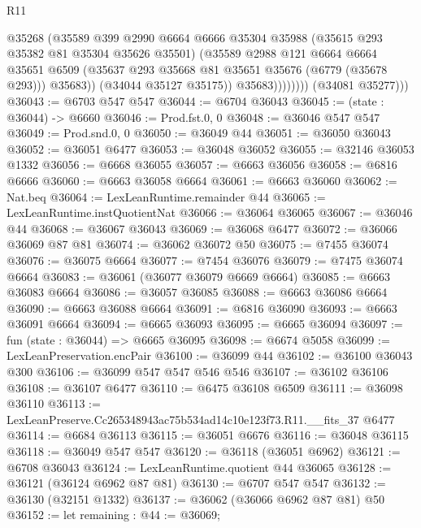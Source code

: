 \begin{lexlean}{R11}
\begin{coremodule}
                          @35268
                          (@35589
                            @399
                            @2990
                            @6664
                            @6666
                            @35304
                            @35988
                            (@35615 @293 @35382 @81 @35304 @35626 @35501)
                            (@35589
                              @2988
                              @121
                              @6664
                              @6664
                              @35651
                              @6509
                              (@35637 @293 @35668 @81 @35651 @35676 (@6779 (@35678 @293)))
                              @35683))
                          (@34044 @35127 @35175))
                        @35683))))))))
        (@34081 @35277)))
@36043 := @6703 @547 @547
@36044 := @6704 @36043
@36045 := (state : @36044) -> @6660
@36046 := Prod.fst.{0, 0}
@36048 := @36046 @547 @547
@36049 := Prod.snd.{0, 0}
@36050 := @36049 @44
@36051 := @36050 @36043
@36052 := @36051 @6477
@36053 := @36048 @36052
@36055 := @32146 @36053 @1332
@36056 := @6668 @36055
@36057 := @6663 @36056
@36058 := @6816 @6666
@36060 := @6663 @36058 @6664
@36061 := @6663 @36060
@36062 := Nat.beq
@36064 := LexLeanRuntime.remainder @44
@36065 := LexLeanRuntime.instQuotientNat
@36066 := @36064 @36065
@36067 := @36046 @44
@36068 := @36067 @36043
@36069 := @36068 @6477
@36072 := @36066 @36069 @87 @81
@36074 := @36062 @36072 @50
@36075 := @7455 @36074
@36076 := @36075 @6664
@36077 := @7454 @36076
@36079 := @7475 @36074 @6664
@36083 := @36061 (@36077 @36079 @6669 @6664)
@36085 := @6663 @36083 @6664
@36086 := @36057 @36085
@36088 := @6663 @36086 @6664
@36090 := @6663 @36088 @6664
@36091 := @6816 @36090
@36093 := @6663 @36091 @6664
@36094 := @6665 @36093
@36095 := @6665 @36094
@36097 := fun (state : @36044) => @6665 @36095
@36098 := @6674 @5058
@36099 := LexLeanPreservation.encPair
@36100 := @36099 @44
@36102 := @36100 @36043 @300
@36106 := @36099 @547 @547 @546 @546
@36107 := @36102 @36106
@36108 := @36107 @6477
@36110 := @6475 @36108 @6509
@36111 := @36098 @36110
@36113 := LexLeanPreserve.Cc265348943ac75b534ad14c10e123f73.R11.__fits_37 @6477
@36114 := @6684 @36113
@36115 := @36051 @6676
@36116 := @36048 @36115
@36118 := @36049 @547 @547
@36120 := @36118 (@36051 @6962)
@36121 := @6708 @36043
@36124 := LexLeanRuntime.quotient @44 @36065
@36128 := @36121 (@36124 @6962 @87 @81)
@36130 := @6707 @547 @547
@36132 := @36130 (@32151 @1332)
@36137 := @36062 (@36066 @6962 @87 @81) @50
@36152 := let remaining : @44 := @36069;

\end{coremodule}
\end{lexlean}

